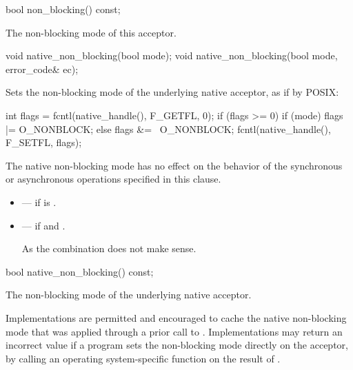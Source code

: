 \begin{itemdecl}
bool non_blocking() const;
\end{itemdecl}

\begin{itemdescr}
\pnum
\returns The non-blocking mode of this acceptor.
\end{itemdescr}

\begin{itemdecl}
void native_non_blocking(bool mode);
void native_non_blocking(bool mode, error_code& ec);
\end{itemdecl}

\begin{itemdescr}
\pnum
\effects Sets the non-blocking mode of the underlying native acceptor, as if by POSIX:
\begin{codeblock}
int flags = fcntl(native_handle(), F_GETFL, 0);
if (flags >= 0)
{
  if (mode)
    flags |= O_NONBLOCK;
  else
    flags &= ~O_NONBLOCK;
  fcntl(native_handle(), F_SETFL, flags);
}
\end{codeblock}


\pnum
 The native non-blocking mode has no effect on the behavior of the synchronous or asynchronous operations specified in this clause.

\pnum
\errors
\begin{itemize}
\item
{} --- if  is .
\item
{} --- if  and . \begin{note} As the combination does not make sense. \end{note}
\end{itemize}
\end{itemdescr}

\begin{itemdecl}
bool native_non_blocking() const;
\end{itemdecl}

\begin{itemdescr}
\pnum
\returns The non-blocking mode of the underlying native acceptor.

\pnum
\remarks Implementations are permitted and encouraged to cache the native non-blocking mode that was applied through a prior call to . Implementations may return an incorrect value if a program sets the non-blocking mode directly on the acceptor, by calling an operating system-specific function on the result of .
\end{itemdescr}

